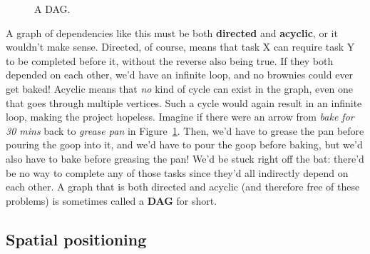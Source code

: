 \begin{description}
\begin{figure}[ht]
\centering
\caption{A DAG.}
\label{DAG}
\end{figure}

A graph of dependencies like this must be both \textbf{directed} and
\textbf{acyclic}, or it wouldn't make sense. Directed, of course, means
that task X can require task Y to be completed before it, without the
reverse also being true. If they both depended on each other, we'd have an
infinite loop, and no brownies could ever get baked! Acyclic means that
\textit{no} kind of cycle can exist in the graph, even one that goes
through multiple vertices. Such a cycle would again result in an infinite
loop, making the project hopeless. Imagine if there were an arrow from
\textsl{bake for 30 mins} back to \textsl{grease pan} in Figure~\ref{DAG}.
Then, we'd have to grease the pan before pouring the goop into it, and we'd
have to pour the goop before baking, but we'd also have to bake before
greasing the pan! We'd be stuck right off the bat: there'd be no way to
complete any of those tasks since they'd all indirectly depend on each
other. A graph that is both directed and acyclic (and therefore free of
these problems) is sometimes called a \textbf{DAG} for short.

\end{description}


\subsection{Spatial positioning}

